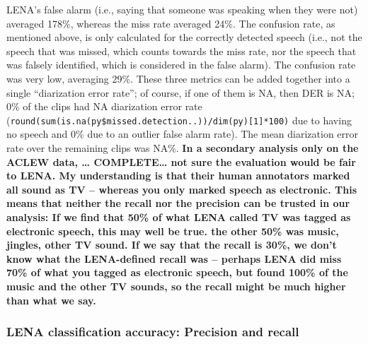 \documentclass[english,floatsintext,man]{apa6}
\begin{document}
LENA's false alarm (i.e., saying that someone was speaking when they
were not) averaged 178\%, whereas the miss rate averaged 24\%. The
confusion rate, as mentioned above, is only calculated for the correctly
detected speech (i.e., not the speech that was missed, which counts
towards the miss rate, nor the speech that was falsely identified, which
is considered in the false alarm). The confusion rate was very low,
averaging 29\%. These three metrics can be added together into a single
\enquote{diarization error rate}; of course, if one of them is NA, then
DER is NA; 0\% of the clips had NA diarization error rate
(\texttt{round(sum(is.na(py\$missed.detection..))/dim(py){[}1{]}*100)}
due to having no speech and 0\% due to an outlier false alarm rate). The
mean diarization error rate over the remaining clips was NA\%.
\textbf{In a secondary analysis only on the ACLEW data, \ldots{}
COMPLETE\ldots{} not sure the evaluation would be fair to LENA. My
understanding is that their human annotators marked all sound as TV --
whereas you only marked speech as electronic. This means that neither
the recall nor the precision can be trusted in our analysis: If we find
that 50\% of what LENA called TV was tagged as electronic speech, this
may well be true. the other 50\% was music, jingles, other TV sound. If
we say that the recall is 30\%, we don't know what the LENA-defined
recall was -- perhaps LENA did miss 70\% of what you tagged as
electronic speech, but found 100\% of the music and the other TV sounds,
so the recall might be much higher than what we say.}

\subsubsection{LENA classification accuracy: Precision and
recall}\label{lena-classification-accuracy-precision-and-recall}
\end{document}
